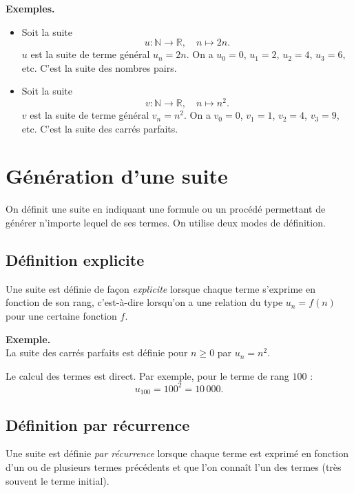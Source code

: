 \documentclass[11pt]{article}
\newcommand{\RR}{\mathbb{R}}
\newcommand{\NN}{\mathbb{N}}
\newcommand{\fonction}[5]{#1 : #2 \to #3,\quad #4 \mapsto #5}
\newenvironment{exemple}{\par\smallskip\noindent\textbf{Exemple. \\}\ignorespaces}{\par\smallskip}
\newenvironment{exemples}{\par\smallskip\noindent\textbf{Exemples. \\}\ignorespaces}{\par\smallskip}
\begin{document}
\begin{exemples}
\begin{itemize}
    \item Soit la suite
    \[
    \fonction{u}{\NN}{\RR}{n}{2n}.
    \]
    $u$ est la suite de terme général $u_n=2n$. On a $u_0=0$, $u_1=2$, $u_2=4$, $u_3=6$, etc. C'est la suite des nombres pairs.

    \item Soit la suite
    \[
    \fonction{v}{\NN}{\RR}{n}{n^2}.
    \]
    $v$ est la suite de terme général $v_n=n^2$. On a $v_0=0$, $v_1=1$, $v_2=4$, $v_3=9$, etc. C'est la suite des carrés parfaits.
\end{itemize}
\end{exemples}

\section{Génération d'une suite}

On définit une suite en indiquant une formule ou un procédé permettant de générer n'importe lequel de ses termes. On utilise deux modes de définition.

\subsection{Définition explicite}

\begin{definition}
Une suite est définie de façon \emph{explicite} lorsque chaque terme s'exprime en fonction de son rang, c'est-à-dire lorsqu'on a une relation du type $u_n=f(n)$ pour une certaine fonction $f$.
\end{definition}

\begin{exemple}
La suite des carrés parfaits est définie pour $n\geq0$ par $u_n=n^2$.

Le calcul des termes est direct. Par exemple, pour le terme de rang $100$ :
\[
u_{100}=100^2=10\,000.
\]
\end{exemple}

\subsection{Définition par récurrence}

\begin{definition}
Une suite est définie \emph{par récurrence} lorsque chaque terme est exprimé en fonction d'un ou de plusieurs termes précédents et que l'on connaît l'un des termes (très souvent le terme initial).
\end{definition}
\end{document}
